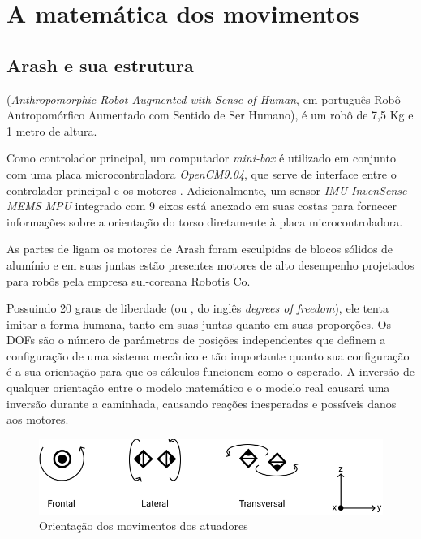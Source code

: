 \chapter{A matemática dos movimentos}
\label{ch:Math}

\section{Arash e sua estrutura}

(\textit{Anthropomorphic Robot Augmented with Sense of Human}, em português Robô Antropomórfico Aumentado com Sentido de Ser Humano), é um robô de 7,5 Kg e 1 metro de altura. 

Como controlador principal, um computador \textit{mini-box} é utilizado em conjunto com uma placa microcontroladora \textit{OpenCM9.04}, que serve de interface entre o controlador principal e os motores \cite{autdp2016}. Adicionalmente, um sensor \textit{IMU InvenSense MEMS MPU} integrado com 9 eixos \cite{karimionline} está anexado em suas costas para fornecer informações sobre a orientação do torso diretamente à placa microcontroladora.

As partes de ligam os motores de Arash foram esculpidas de blocos sólidos de alumínio e em suas juntas estão presentes motores de alto desempenho projetados para robôs pela empresa sul-coreana Robotis Co.

Possuindo 20 graus de liberdade (ou , do inglês \textit{degrees of freedom}), ele tenta imitar a forma humana, tanto em suas juntas quanto em suas proporções. Os DOFs são o número de parâmetros de posições independentes que definem a configuração de uma sistema mecânico \cite{craig1989} e tão importante quanto sua configuração é a sua orientação para que os cálculos funcionem como o esperado. A inversão de qualquer orientação entre o modelo matemático e o modelo real causará uma inversão durante a caminhada, causando reações inesperadas e possíveis danos aos motores.

\begin{figure}[htb]
	\centering
	\includegraphics[scale=1]{imagens/svg/actuators-orientation}
	\caption{Orientação dos movimentos dos atuadores}
	\label{fig:ActuatorsOrientation}
\end{figure}


